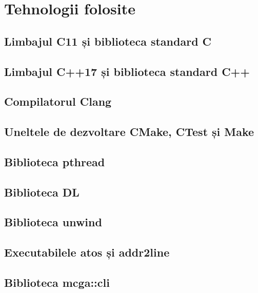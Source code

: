 \section{Tehnologii folosite}
\subsection{Limbajul C11 și biblioteca standard C}
\subsection{Limbajul C++17 și biblioteca standard C++}
\subsection{Compilatorul Clang}
\subsection{Uneltele de dezvoltare CMake, CTest și Make}
\subsection{Biblioteca pthread}
\subsection{Biblioteca DL}
\subsection{Biblioteca unwind}
\subsection{Executabilele atos și addr2line}
\subsection{Biblioteca mcga::cli}
